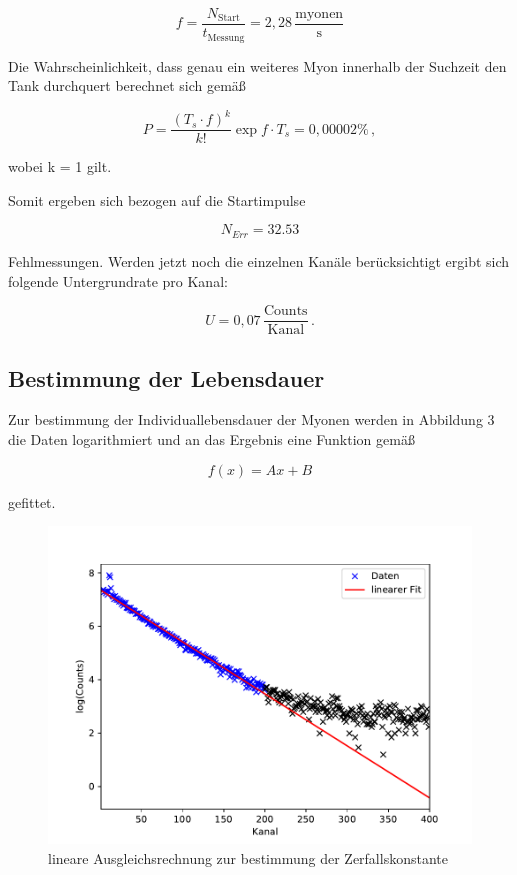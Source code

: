 \begin{equation}
f = \frac{N_{\text{Start}}}{t_{\text{Messung}}} = 2,28 \, \frac{\text{myonen}}{\text{s}}
\end{equation}

\noindent Die Wahrscheinlichkeit, dass genau ein weiteres Myon innerhalb der Suchzeit den Tank durchquert berechnet sich gemäß

\begin{equation}
P = \frac{(T_s \cdot f)^k}{k!} \exp{f \cdot T_s} = 0,00002 \%\,,
\end{equation}

\noindent wobei k = 1 gilt.

\noindent Somit ergeben sich bezogen auf die Startimpulse

\begin{equation}
N_{Err} = 32.53
\end{equation}

\noindent Fehlmessungen. Werden jetzt noch die einzelnen Kanäle berücksichtigt ergibt sich folgende Untergrundrate pro Kanal:

\begin{equation}
U = 0,07 \, \frac{\text{Counts}}{\text{Kanal}}\,.
\end{equation}

\subsection{Bestimmung der Lebensdauer}
\label{subsec:lifetime}
Zur bestimmung der Individuallebensdauer der Myonen werden in Abbildung 3 die Daten logarithmiert und an das Ergebnis eine Funktion gemäß

\begin{equation}
f(x) = Ax + B
\end{equation}

\noindent gefittet.

\begin{figure}
	\centering
	\includegraphics[width=\textwidth]{img/myons.pdf}
	\caption{lineare Ausgleichsrechnung zur bestimmung der Zerfallskonstante}
	\label{abb:fit}
\end{figure}

